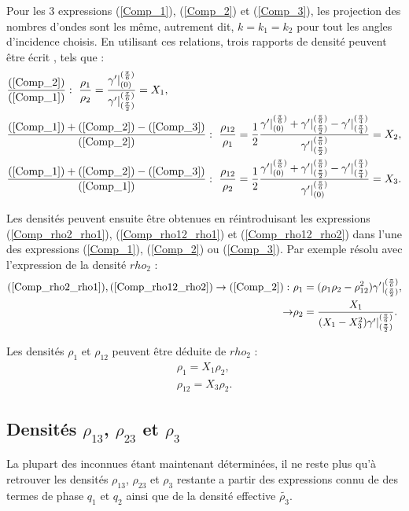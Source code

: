\documentclass[12pt]{report}
\begin{document}
    Pour les 3 expressions (\ref{Comp_1}), (\ref{Comp_2}) et (\ref{Comp_3}), les projection des nombres d'ondes sont les même, autrement dit, $k=k_1=k_2$ pour tout les angles d'incidence choisis.
    En utilisant ces relations, trois rapports de densité peuvent être écrit , tels que :
    \begin{align}
    &\frac{(\ref{Comp_2})}{(\ref{Comp_1})} :\ \frac{\rho_1}{\rho_2}=\frac{\gamma'|^{(\frac{\pi}{6})}_{(0)}}{\gamma'|^{(\frac{\pi}{6})}_{(\frac{\pi}{2})}}=X_1,\label{Comp_rho2_rho1} \\
    &\frac{(\ref{Comp_1})+(\ref{Comp_2})-(\ref{Comp_3})}{(\ref{Comp_2})} :\ \frac{\rho_{12}}{\rho_1}=\frac{1}{2}\frac{\gamma'|^{(\frac{\pi}{6})}_{(0)}+\gamma'|^{(\frac{\pi}{6})}_{(\frac{\pi}{2})}-\gamma'|^{(\frac{\pi}{4})}_{(\frac{\pi}{4})}}{\gamma'|^{(\frac{\pi}{6})}_{(\frac{\pi}{2})}}=X_2,\label{Comp_rho12_rho1} \\
    &\frac{(\ref{Comp_1})+(\ref{Comp_2})-(\ref{Comp_3})}{(\ref{Comp_1})} :\ \frac{\rho_{12}}{\rho_2}=\frac{1}{2}\frac{\gamma'|^{(\frac{\pi}{6})}_{(0)}+\gamma'|^{(\frac{\pi}{6})}_{(\frac{\pi}{2})}-\gamma'|^{(\frac{\pi}{4})}_{(\frac{\pi}{4})}}{\gamma'|^{(\frac{\pi}{6})}_{(0)}}=X_3.\label{Comp_rho12_rho2}
    \end{align}
    
    Les densités peuvent ensuite être obtenues en réintroduisant les expressions (\ref{Comp_rho2_rho1}), (\ref{Comp_rho12_rho1}) et (\ref{Comp_rho12_rho2}) dans l'une des expressions (\ref{Comp_1}), (\ref{Comp_2}) ou (\ref{Comp_3}). Par exemple résolu avec l'expression de la densité $rho_2$ :
    \begin{align*}
    (\ref{Comp_rho2_rho1}),(\ref{Comp_rho12_rho2}) \rightarrow (\ref{Comp_2}) :\ &\rho_1=(\rho_1\rho_2-\rho_{12}^2)\gamma'|^{(\frac{\pi}{6})}_{(\frac{\pi}{2})},\\
    \rightarrow &\rho_2=\frac{X_1}{(X_1-X_3^2)\gamma'|^{(\frac{\pi}{6})}_{(\frac{\pi}{2})}}.
    \end{align*}
    
    Les densités $\rho_1$ et $\rho_{12}$ peuvent être déduite de $rho_2$ :
    \begin{align*}
    \rho_1=X_1 \rho_2,\\
    \rho_{12}=X_3\rho_2.
    \end{align*}
    
\subsection{Densités $\rho_{13}$, $\rho_{23}$ et $\rho_3$}
    La plupart des inconnues étant maintenant déterminées, il ne reste plus qu'à retrouver les densités $\rho_{13}$, $\rho_{23}$ et $\rho_3$ restante a partir des expressions connu de des termes de phase $q_1$ et $q_2$ ainsi que de la densité effective $\tilde{\rho_3}$.
    
\end{document}
